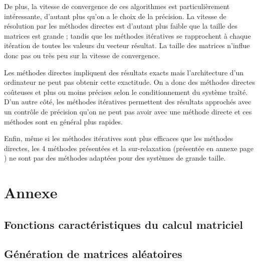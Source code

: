 \documentclass{report}
\begin{document}
    De plus, la vitesse de convergence de ces algorithmes est particulièrement intéressante, d'autant plus qu'on a le choix de la précision. La vitesse de résolution par les méthodes directes est d'autant plus faible que la taille des matrices est grande ; tandis que les méthodes itératives se rapprochent à chaque itération de toutes les valeurs du vecteur résultat. La taille des matrices n'influe donc pas ou très peu sur la vitesse de convergence.

    Les méthodes directes impliquent des résultats exacts mais l'architecture d'un ordinateur ne peut pas obtenir cette exactitude. On a donc des méthodes directes coûteuses et plus ou moins précises selon le conditionnement du système traîté. D'un autre côté, les méthodes itératives permettent des résultats approchés avec un contrôle de précision qu'on ne peut pas avoir avec une méthode directe et ces méthodes sont en général plus rapides.

    Enfin, même si les méthodes itératives sont plus efficaces que les méthodes directes, les 4 méthodes présentées et la sur-relaxation (présentée en annexe page \pageref{surrelaxation}) ne sont pas des méthodes adaptées pour des systèmes de grande taille.
    \newpage
  \chapter{Annexe}
    \section{Fonctions caractéristiques du calcul matriciel}
      
      
      \newpage
    \section{Génération de matrices aléatoires}
      
      
      \newpage
\end{document}

